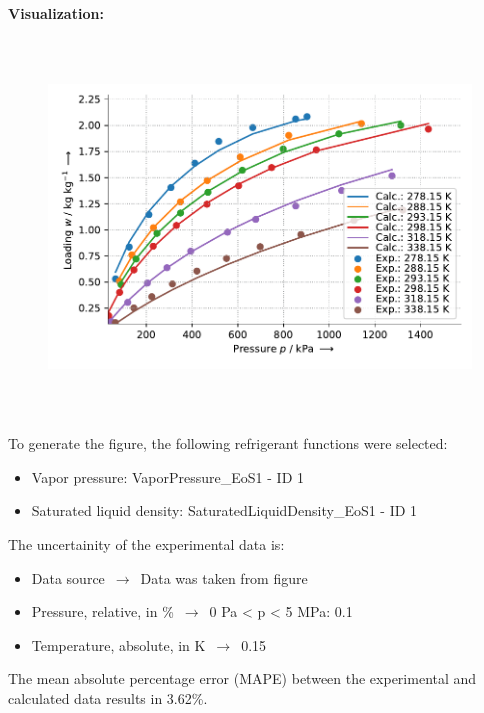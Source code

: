 \textbf{Visualization:}
%
\begin{figure}[!htp]
{\noindent\includegraphics[height=10cm, keepaspectratio]{figs/ads/ads_R-410a_activated_carbon_powder_Maxsorb_III_DubininAstakhov_2.pdf}}
\end{figure}
%

To generate the figure, the following refrigerant functions were selected:
\begin{itemize}
\item Vapor pressure: VaporPressure\_EoS1 - ID 1
\item Saturated liquid density: SaturatedLiquidDensity\_EoS1 - ID 1
\end{itemize}

The uncertainity of the experimental data is:
\begin{itemize}
\item Data source $\,\to\,$ Data was taken from figure
\item Pressure, relative, in \% $\,\to\,$ 0 Pa < p < 5 MPa: 0.1%
\item Temperature, absolute, in $\si{\kelvin}$ $\,\to\,$ 0.15
\end{itemize}

The mean absolute percentage error (MAPE) between the experimental and calculated data results in 3.62\%.
\FloatBarrier
\newpage
